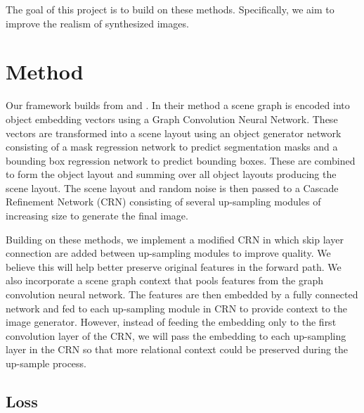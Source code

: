 \documentclass{article}
\begin{document}
The goal of this project is to build on these methods. Specifically, we aim to improve the realism of synthesized images.

\section{Method}

Our framework builds from \cite{sg2im} and \cite{sg2imgcontext}. In their method a scene graph is encoded into object embedding vectors using a Graph Convolution Neural Network. These vectors are transformed into a scene layout using an object generator network consisting of a mask regression network to predict segmentation masks and a bounding box regression network to predict bounding boxes. These are combined to form the object layout and summing over all object layouts producing the scene layout. The scene layout and random noise is then passed to a Cascade Refinement Network (CRN) \cite{crn} consisting of several up-sampling modules of increasing size to generate the final image.

Building on these methods, we implement a modified CRN in which skip layer connection are added between up-sampling modules to improve quality. We believe this will help better preserve original features in the forward path. We also incorporate a scene graph context \cite{sg2imgcontext} that pools features from the graph convolution neural network. The features are then embedded by a fully connected network and fed to each up-sampling module in CRN to provide context to the image generator. However, instead of feeding the embedding only to the first convolution layer of the CRN, we will pass the embedding to each up-sampling layer in the CRN so that more relational context could be preserved during the up-sample process.

\subsection{Loss}
\end{document}
